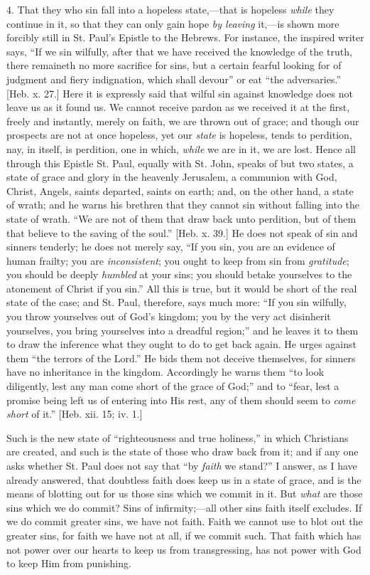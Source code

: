 4. That they who sin fall into a hopeless state,—that is hopeless
\emph{while} they continue in it, so that they can only gain hope \emph{by
leaving} it,—is shown more forcibly still in St. Paul's Epistle
to the Hebrews. For instance, the inspired writer says, ``If we
sin wilfully, after that we have received the knowledge of the truth,
there remaineth no more sacrifice for sins, but a certain fearful
looking for of judgment and fiery indignation, which shall
devour'' or eat ``the adversaries.'' [Heb. x. 27.] Here it
is expressly said that wilful sin against knowledge does not leave us
as it found us. We cannot receive pardon as we received it at the
first, freely and instantly, merely on faith, we are thrown out of
grace; and though our prospects are not at once hopeless, yet our \emph{state}
is hopeless, tends to perdition, nay, in itself, is perdition, one in
which, \emph{while} we are in it, we are lost. Hence all through this
Epistle St. Paul, equally with St. John, speaks of but two states, a
state of grace and glory in the heavenly Jerusalem, a communion with
God, Christ, Angels, saints departed, saints on earth; and, on the
other hand, a state of wrath; and he warns his brethren that they
cannot sin without falling into the state of wrath. ``We are not
of them that draw back unto perdition, but of them that believe to the
saving of the soul.'' [Heb. x. 39.] He does not speak of sin and
sinners tenderly; he does not merely say, ``If you sin, you are an
evidence of human frailty; you are \emph{inconsistent}; you ought to
keep from sin from \emph{gratitude}; you should be deeply \emph{humbled}
at your sins; you should betake yourselves to the atonement of Christ
if you sin.'' All this is true, but it would be short of the real
state of the case; and St. Paul, therefore, says much more: ``If
you sin wilfully, you throw yourselves out of God's kingdom; you by
the very act disinherit yourselves, you bring yourselves into a
dreadful region;'' and he leaves it to them to draw the inference
what they ought to do to get back again. He urges against them
``the terrors of the Lord.'' He bids them not deceive
themselves, for sinners have no inheritance in the kingdom.
Accordingly he warns them ``to look diligently, lest any man come
short of the grace of God;'' and to ``fear, lest a promise
being left us of entering into His rest, any of them should seem to \emph{come
short} of it.'' [Heb. xii. 15; iv. 1.]

Such is the new state of ``righteousness and true
holiness,'' in which Christians are created, and such is the state
of those who draw back from it; and if any one asks whether St. Paul
does not say that ``by \emph{faith} we stand?'' I answer, as I
have already answered, that doubtless faith does keep us in a state of
grace, and is the means of blotting out for us those sins which we
commit in it. But \emph{what} are those sins which we do commit? Sins
of infirmity;—all other sins faith itself excludes. If we do commit
greater sins, we have not faith. Faith we cannot use to blot out the
greater sins, for faith we have not at all, if we commit such. That
faith which has not power over our hearts to keep us from
transgressing, has not power with God to keep Him from punishing.

